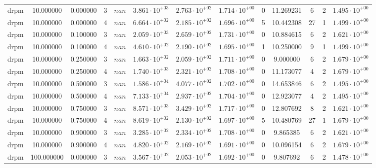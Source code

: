 \begin{table}
\begin{tabular}{ccccccccccccc}
drpm & 10.000000 & 0.000000 & 3 & $nan$ & $3.861 \cdot 10^{+03}$ & $2.763 \cdot 10^{+02}$ & $1.714 \cdot 10^{+00}$ & 0 & 11.269231 & 6 & 2 & $1.495 \cdot 10^{+00}$ \\
drpm & 10.000000 & 0.000000 & 4 & $nan$ & $6.664 \cdot 10^{+02}$ & $2.185 \cdot 10^{+02}$ & $1.696 \cdot 10^{+00}$ & 5 & 10.442308 & 27 & 1 & $1.499 \cdot 10^{+00}$ \\
drpm & 10.000000 & 0.100000 & 3 & $nan$ & $2.059 \cdot 10^{+03}$ & $2.659 \cdot 10^{+02}$ & $1.731 \cdot 10^{+00}$ & 0 & 10.884615 & 6 & 2 & $1.621 \cdot 10^{+00}$ \\
drpm & 10.000000 & 0.100000 & 4 & $nan$ & $4.610 \cdot 10^{+02}$ & $2.190 \cdot 10^{+02}$ & $1.695 \cdot 10^{+00}$ & 1 & 10.250000 & 9 & 1 & $1.499 \cdot 10^{+00}$ \\
drpm & 10.000000 & 0.250000 & 3 & $nan$ & $1.663 \cdot 10^{+02}$ & $2.059 \cdot 10^{+02}$ & $1.711 \cdot 10^{+00}$ & 0 & 9.000000 & 6 & 2 & $1.679 \cdot 10^{+00}$ \\
drpm & 10.000000 & 0.250000 & 4 & $nan$ & $1.740 \cdot 10^{+03}$ & $2.321 \cdot 10^{+02}$ & $1.708 \cdot 10^{+00}$ & 0 & 11.173077 & 4 & 2 & $1.679 \cdot 10^{+00}$ \\
drpm & 10.000000 & 0.500000 & 3 & $nan$ & $1.586 \cdot 10^{+04}$ & $4.077 \cdot 10^{+02}$ & $1.702 \cdot 10^{+00}$ & 0 & 14.653846 & 6 & 2 & $1.495 \cdot 10^{+00}$ \\
drpm & 10.000000 & 0.500000 & 4 & $nan$ & $7.133 \cdot 10^{+04}$ & $2.937 \cdot 10^{+02}$ & $1.704 \cdot 10^{+00}$ & 0 & 12.923077 & 4 & 2 & $1.495 \cdot 10^{+00}$ \\
drpm & 10.000000 & 0.750000 & 3 & $nan$ & $8.571 \cdot 10^{+03}$ & $3.429 \cdot 10^{+02}$ & $1.717 \cdot 10^{+00}$ & 0 & 12.807692 & 8 & 2 & $1.621 \cdot 10^{+00}$ \\
drpm & 10.000000 & 0.750000 & 4 & $nan$ & $8.619 \cdot 10^{+02}$ & $2.130 \cdot 10^{+02}$ & $1.697 \cdot 10^{+00}$ & 5 & 10.480769 & 27 & 1 & $1.679 \cdot 10^{+00}$ \\
drpm & 10.000000 & 0.900000 & 3 & $nan$ & $3.285 \cdot 10^{+02}$ & $2.334 \cdot 10^{+02}$ & $1.708 \cdot 10^{+00}$ & 0 & 9.865385 & 6 & 2 & $1.621 \cdot 10^{+00}$ \\
drpm & 10.000000 & 0.900000 & 4 & $nan$ & $4.820 \cdot 10^{+02}$ & $2.169 \cdot 10^{+02}$ & $1.691 \cdot 10^{+00}$ & 0 & 10.096154 & 6 & 2 & $1.679 \cdot 10^{+00}$ \\
drpm & 100.000000 & 0.000000 & 3 & $nan$ & $3.567 \cdot 10^{+02}$ & $2.053 \cdot 10^{+02}$ & $1.692 \cdot 10^{+00}$ & 0 & 9.807692 & 6 & 2 & $1.478 \cdot 10^{+00}$ \\

\end{tabular}
\end{table}
